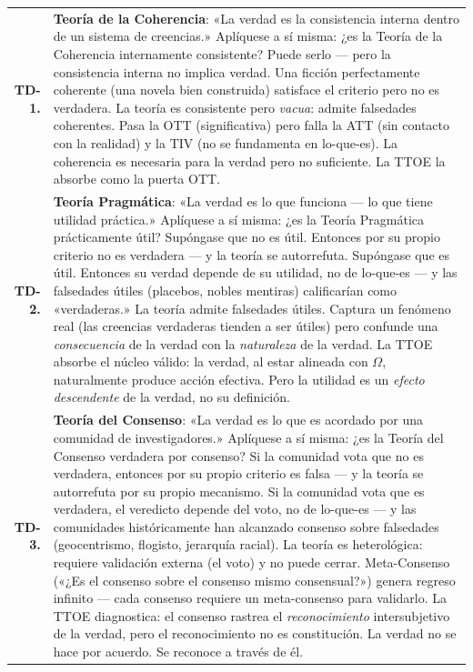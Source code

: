 \documentclass[10pt, openany, oneside]{book}
\renewcommand{\footnotesize}{\fontsize{8.5}{11}\selectfont}
\begin{document}
{\footnotesize
\noindent\begin{tabular}{r p{}}
\textbf{TD-1.} & \textbf{Teoría de la Coherencia}: «La verdad es la consistencia interna dentro de un sistema de creencias.» Aplíquese a sí misma: ¿es la Teoría de la Coherencia internamente consistente? Puede serlo --- pero la consistencia interna no implica verdad. Una ficción perfectamente coherente (una novela bien construida) satisface el criterio pero no es verdadera. La teoría es consistente pero \textit{vacua}: admite falsedades coherentes. Pasa la OTT (significativa) pero falla la ATT (sin contacto con la realidad) y la TIV (no se fundamenta en lo-que-es). La coherencia es necesaria para la verdad pero no suficiente. La TTOE la absorbe como la puerta OTT. \\[0.5em]
\textbf{TD-2.} & \textbf{Teoría Pragmática}: «La verdad es lo que funciona --- lo que tiene utilidad práctica.» Aplíquese a sí misma: ¿es la Teoría Pragmática prácticamente útil? Supóngase que no es útil. Entonces por su propio criterio no es verdadera --- y la teoría se autorrefuta. Supóngase que es útil. Entonces su verdad depende de su utilidad, no de lo-que-es --- y las falsedades útiles (placebos, nobles mentiras) calificarían como «verdaderas.» La teoría admite falsedades útiles. Captura un fenómeno real (las creencias verdaderas tienden a ser útiles) pero confunde una \textit{consecuencia} de la verdad con la \textit{naturaleza} de la verdad. La TTOE absorbe el núcleo válido: la verdad, al estar alineada con $\Omega$, naturalmente produce acción efectiva. Pero la utilidad es un \textit{efecto descendente} de la verdad, no su definición. \\[0.5em]
\textbf{TD-3.} & \textbf{Teoría del Consenso}: «La verdad es lo que es acordado por una comunidad de investigadores.» Aplíquese a sí misma: ¿es la Teoría del Consenso verdadera por consenso? Si la comunidad vota que no es verdadera, entonces por su propio criterio es falsa --- y la teoría se autorrefuta por su propio mecanismo. Si la comunidad vota que es verdadera, el veredicto depende del voto, no de lo-que-es --- y las comunidades históricamente han alcanzado consenso sobre falsedades (geocentrismo, flogisto, jerarquía racial). La teoría es heterológica: requiere validación externa (el voto) y no puede cerrar. Meta-Consenso («¿Es el consenso sobre el consenso mismo consensual?») genera regreso infinito --- cada consenso requiere un meta-consenso para validarlo. La TTOE diagnostica: el consenso rastrea el \textit{reconocimiento} intersubjetivo de la verdad, pero el reconocimiento no es constitución. La verdad no se hace por acuerdo. Se reconoce a través de él. \\[0.3em]
\end{tabular}
}
\end{document}
